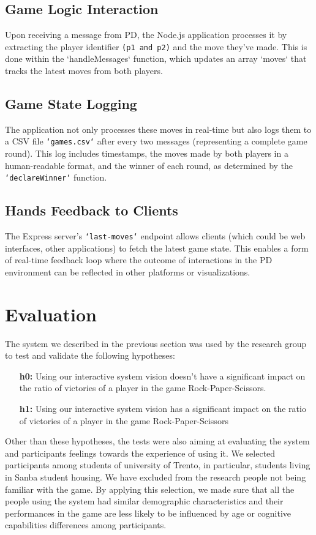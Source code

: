 \documentclass[11pt,a4paper]{report}
\begin{document}
\subsection*{Game Logic Interaction}
Upon receiving a message from PD, the Node.js application processes it by extracting the player identifier \texttt{(p1 and p2)} and the move they've made. This is done within the `handleMessages` function, which updates an array `moves` that tracks the latest moves from both players.

\subsection*{Game State Logging}
The application not only processes these moves in real-time but also logs them to a CSV file \texttt{`games.csv`} after every two messages (representing a complete game round). This log includes timestamps, the moves made by both players in a human-readable format, and the winner of each round, as determined by the \texttt{`declareWinner`} function.

\subsection*{Hands Feedback to Clients}
The Express server's \texttt{`\/last-moves`} endpoint allows clients (which could be web interfaces, other applications) to fetch the latest game state. This enables a form of real-time feedback loop where the outcome of interactions in the PD environment can be reflected in other platforms or visualizations.

\section*{Evaluation}\label{sec:Evaluation}
The system we described in the previous section was used by the research group to test and validate the following hypotheses:
\begin{itemize}
  \item [\textbf{h0:}] Using our interactive system vision doesn’t have a significant impact on the ratio of victories of a player in the game Rock-Paper-Scissors.
  \item [\textbf{h1:}] Using our interactive system vision has a significant impact on the ratio of victories of a player in the game Rock-Paper-Scissors
\end{itemize}

\noindent Other than these hypotheses, the tests were also aiming at evaluating the system and participants feelings towards the experience of using it.
We selected participants among students of university of Trento, in particular, students living in Sanba student housing. We have excluded from the research people not being familiar with the game. By applying this selection, we made sure that all the people using the system had similar demographic characteristics and their performances in the game are less likely to be influenced by age or cognitive capabilities differences among participants. 
\end{document}
